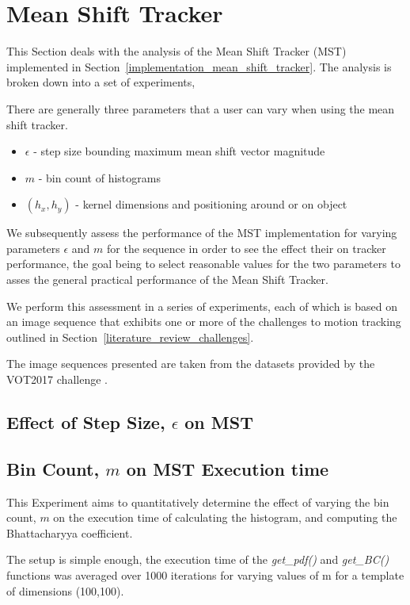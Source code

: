 \section{Mean Shift Tracker}
This Section deals with the analysis of the Mean Shift Tracker (MST)
implemented in Section~\ref{implementation_mean_shift_tracker}. The analysis is
broken down into a set of experiments,

There are generally three parameters that a user can vary when using the mean
shift tracker. 
\begin{itemize}
    \item $\epsilon$ - step size bounding maximum mean shift vector magnitude
    \item $m$ - bin count of histograms
    \item $(h_x,h_y)$ - kernel dimensions and positioning around or on object
\end{itemize}
We subsequently assess the performance of the MST implementation
for varying parameters $\epsilon$ and $m$ for the sequence in order to see the
effect their on tracker performance, the goal being to select reasonable values
for the two parameters to asses the general practical performance of the Mean
Shift Tracker. 

We perform this assessment in a series of experiments, each of which is based on an image
sequence that exhibits one or more of the challenges to motion tracking outlined
in Section~\ref{literature_review_challenges}. 
 
The image sequences presented are taken from the datasets provided by the VOT2017
challenge \cite{VOT_TPAMI}.


\subsection{Effect of Step Size, $\epsilon$ on MST}\label{results_eps}


\subsection{Bin Count, $m$ on MST Execution time}\label{results_m}
This Experiment aims to quantitatively determine the effect of varying the
bin count, $m$ on the execution time of calculating the histogram, and computing
the Bhattacharyya coefficient.

The setup is simple enough, the execution time of the \textit{get\_pdf()} and
\textit{get\_BC()} functions was averaged over 1000 iterations for varying
values of m for a template of dimensions (100,100).

